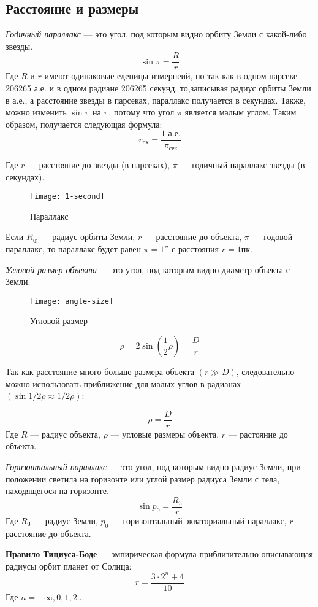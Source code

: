 \subsection{Расстояние и размеры}
\textit{Годичный параллакс} --- это угол, под которым видно орбиту Земли с какой-либо звезды.
\begin{equation}
\sin\pi=\frac{R}{r}
\end{equation}
Где $R$ и $r$ имеют одинаковые еденицы измернеий, но так как в одном парсеке 206265 а.е. и в одном радиане 206265 секунд, то,записывая радиус орбиты Земли в а.е., а расстояние звезды в парсеках, параллакс получается в секундах. Также, можно изменить $\sin\pi$ на $\pi$, потому что угол $\pi$ является малым углом. Таким образом, получается следующая формула:\begin{equation}
r_{\text{пк}}=\frac{1\text{ а.е.}}{\pi_{\text{сек}}}
\end{equation}

Где $r$ --- расстояние до звезды (в парсеках), $\pi$ --- годичный параллакс звезды (в секундах).
\begin{figure}[!h]
\centering
\texttt{[image: 1-second]}
\caption{Параллакс}
\end{figure}

Если $R_{\oplus}$ --- радиус орбиты Земли, $r$ --- расстояние до объекта, $\pi$ --- годовой параллакс, то параллакс будет равен $\pi=1''$ с расстояния $r=1$пк.

\textit{Угловой размер объекта} --- это угол, под которым видно диаметр объекта с Земли.

\begin{figure}[!h]
\centering
\texttt{[image: angle-size]}
\caption{Угловой размер}
\end{figure}

\begin{equation}
\rho =2\sin \left( \frac{1}{2} \rho \right)=\frac{D}{r}
\end{equation}

Так как расстояние много больше размера объекта $(r\gg D)$, следовательно можно использовать приближение для малых углов в радианах $(\sin 1/2\rho\approx 1/2\rho)$:

\begin{equation}
\rho=\frac{D}{r}
\end{equation}
Где $R$ --- радиус объекта, $\rho$ --- угловые размеры объекта, $r$ --- растояние до объекта.

\textit{Горизонтальный параллакс} --- это угол, под которым видно радиус Земли, при положении светила на горизонте или углой размер радиуса Земли с тела, находящегося на горизонте.
\begin{equation}
\sin p_0=\frac{R_{\text{З}}}{r}
\end{equation}
Где $R_{\text{З}}$ --- радиус Земли, $p_0$ --- горизонтальный экваториальный параллакс, $r$ --- расстояние до объекта.

\textbf{Правило Тициуса-Боде} --- эмпирическая формула приблизительно описывающая радиусы орбит планет от Солнца:
\begin{equation}r=\frac{3\cdot 2^n+4}{10}
\end{equation}
Где $n=-\infty, 0, 1, 2...$

